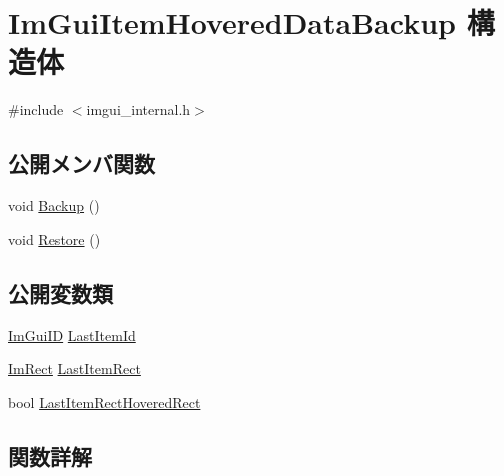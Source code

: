 \hypertarget{struct_im_gui_item_hovered_data_backup}{}\section{Im\+Gui\+Item\+Hovered\+Data\+Backup 構造体}
\label{struct_im_gui_item_hovered_data_backup}


{\ttfamily \#include $<$imgui\+\_\+internal.\+h$>$}

\subsection*{公開メンバ関数}
\begin{DoxyCompactItemize}
\item 
void \mbox{\hyperlink{struct_im_gui_item_hovered_data_backup_a2084500d9cbc9455e52fbe87c95f2315}{Backup}} ()
\item 
void \mbox{\hyperlink{struct_im_gui_item_hovered_data_backup_a4d807799df14f74bde55482134b076cc}{Restore}} ()
\end{DoxyCompactItemize}
\subsection*{公開変数類}
\begin{DoxyCompactItemize}
\item 
\mbox{\hyperlink{imgui_8h_a1785c9b6f4e16406764a85f32582236f}{Im\+Gui\+ID}} \mbox{\hyperlink{struct_im_gui_item_hovered_data_backup_a5e0b18013d983269deba7976666fc501}{Last\+Item\+Id}}
\item 
\mbox{\hyperlink{struct_im_rect}{Im\+Rect}} \mbox{\hyperlink{struct_im_gui_item_hovered_data_backup_ae489c222bed561950104a46ddf1387f3}{Last\+Item\+Rect}}
\item 
bool \mbox{\hyperlink{struct_im_gui_item_hovered_data_backup_a48dd47c573d5299de25be908d77f23f0}{Last\+Item\+Rect\+Hovered\+Rect}}
\end{DoxyCompactItemize}


\subsection{関数詳解}
\mbox{\label{struct_im_gui_item_hovered_data_backup_a2084500d9cbc9455e52fbe87c95f2315}} 
